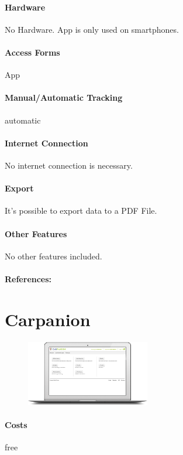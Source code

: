 \paragraph{Hardware} No Hardware. App is only used on smartphones.
\paragraph{Access Forms} App
\paragraph{Manual/Automatic Tracking} automatic
\paragraph{Internet Connection} No internet connection is necessary.
\paragraph{Export} It’s possible to export data to a PDF File.
\paragraph{Other Features} No other features included.
\paragraph{References:} \cite{MyLog_GPS_Fahrtenbuch_Costs}
\newpage

\section{Carpanion}
\begin{figure}
  \begin{center}
    \includegraphics[width=0.48\textwidth]{bilder/Carpanion1}
  \end{center}
\end{figure}
\paragraph{Costs} free
